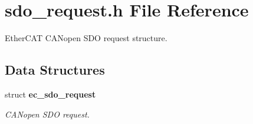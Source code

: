 \section{sdo\-\_\-request.\-h \-File \-Reference}
\label{sdo__request_8h}


\-Ether\-C\-A\-T \-C\-A\-Nopen \-S\-D\-O request structure.  


\subsection*{\-Data \-Structures}
\begin{DoxyCompactItemize}
\item 
struct {\bf ec\-\_\-sdo\-\_\-request}
\begin{DoxyCompactList}\small\item\em \-C\-A\-Nopen \-S\-D\-O request. \end{DoxyCompactList}\end{DoxyCompactItemize}
